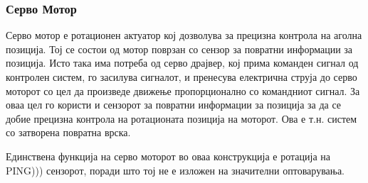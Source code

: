 \documentclass[12pt]{article}
\begin{document}
  \subsubsection{Серво Мотор}
		Серво мотор е ротационен актуатор кој дозволува за прецизна контрола на аголна позиција. Тој се состои од мотор поврзан со сензор за повратни информации за позиција. Исто така има потреба од серво драјвер, кој прима команден сигнал од контролен систем, го засилува сигналот, и пренесува електрична струја до серво моторот со цел да произведе движење пропорционално со командниот сигнал. За оваа цел го користи и сензорот за повратни информации за позиција за да се добие прецизна контрола на ротационата позиција на моторот. Ова е т.н. систем со затворена повратна врска.

		Единствена функција на серво моторот во оваа конструкција е ротација на PING))) сензорот, поради што тој не е изложен на значителни оптоварувања.
\end{document}
